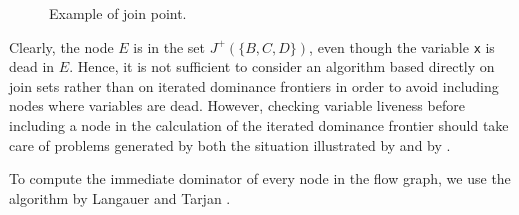 \begin{figure}
\begin{center}
\end{center}
\caption{\label{fig-ssa-join-2}
Example of join point.}
\end{figure}

Clearly, the node $E$ is in the set $J^+(\{B, C, D\})$, even though
the variable \texttt{x} is dead in $E$.  Hence, it is not sufficient
to consider an algorithm based directly on join sets rather than on
iterated dominance frontiers in order to avoid including nodes where
variables are dead.   However, checking variable liveness before
including a node in the calculation of the iterated dominance frontier
should take care of problems generated by both the situation
illustrated by  and by .

To compute the immediate dominator of every node in the flow graph, we
use the algorithm by Langauer and Tarjan
\cite{Lengauer:1979:FAF:357062.357071}. 
